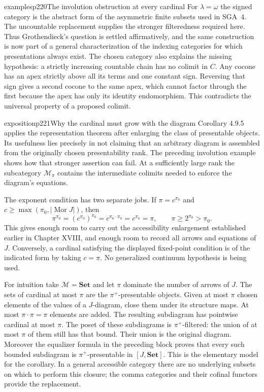 \begin{dcomment}{examples}{p220}{The involution obstruction at every cardinal}
For $\lambda=\omega$ the signed category is the abstract form of the asymmetric finite subsets used in SGA~4.  The uncountable replacement supplies the stronger filteredness required here.  Thus Grothendieck's question is settled affirmatively, and the same construction is now part of a general characterization of the indexing categories for which presentations always exist.  The chosen category also explains the missing hypothesis: a strictly increasing countable chain has no colimit in $C$.  Any cocone has an apex strictly above all its terms and one constant sign.  Reversing that sign gives a second cocone to the same apex, which cannot factor through the first because the apex has only its identity endomorphism.  This contradicts the universal property of a proposed colimit.
\end{dcomment}

\begin{dcomment}{exposition}{p221}{Why the cardinal must grow with the diagram}
Corollary 4.9.5 applies the representation theorem after enlarging the class of presentable objects.  Its usefulness lies precisely in not claiming that an arbitrary diagram is assembled from the originally chosen presentability rank.  The preceding involution example shows how that stronger assertion can fail.  At a sufficiently large rank the subcategory $\mathcal M_\pi$ contains the intermediate colimits needed to enforce the diagram's equations.

The exponent condition has two separate jobs.  If $\pi=c^{\pi_0}$ and $c\geq\max(\pi_0,|\operatorname{Mor}J|)$, then
\[
 \pi^{\pi_0}=(c^{\pi_0})^{\pi_0}
 =c^{\pi_0\cdot\pi_0}=c^{\pi_0}=\pi,
 \qquad \pi\geq 2^{\pi_0}>\pi_0.
\]
This gives enough room to carry out the accessibility enlargement established earlier in Chapter XVIII, and enough room to record all arrows and equations of $J$.  Conversely, a cardinal satisfying the displayed fixed-point condition is of the indicated form by taking $c=\pi$.  No generalized continuum hypothesis is being used.

For intuition take $\mathcal M=\mathbf{Set}$ and let $\pi$ dominate the number of arrows of $J$.  The sets of cardinal at most $\pi$ are the $\pi^+$-presentable objects.  Given at most $\pi$ chosen elements of the values of a $J$-diagram, close them under its structure maps.  At most $\pi\cdot\pi=\pi$ elements are added.  The resulting subdiagram has pointwise cardinal at most $\pi$.  The poset of these subdiagrams is $\pi^+$-filtered: the union of at most $\pi$ of them still has that bound.  Their union is the original diagram.  Moreover the equalizer formula in the preceding block proves that every such bounded subdiagram is $\pi^+$-presentable in $[J,\mathbf{Set}]$.  This is the elementary model for the corollary.  In a general accessible category there are no underlying subsets on which to perform this closure; the comma categories and their cofinal functors provide the replacement.
\end{dcomment}

